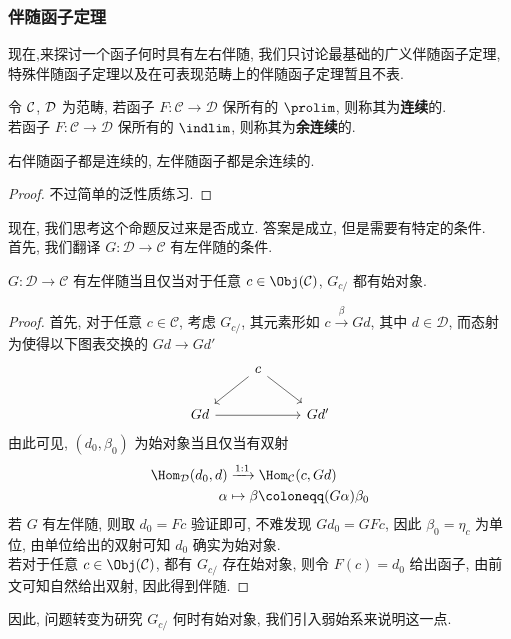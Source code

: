 \subsubsection{伴随函子定理}
现在,来探讨一个函子何时具有左右伴随, 我们只讨论最基础的广义伴随函子定理, 特殊伴随函子定理以及在可表现范畴上的伴随函子定理暂且不表.
\begin{definition}
    令 $\cal{C}$, $\cal{D}$ 为范畴, 若函子 $F \colon \mathcal{C}\to \mathcal{D}$ 保所有的 $\prolim$, 则称其为\textbf{连续}的.\\
    若函子 $F \colon \mathcal{C} \to \mathcal{D}$ 保所有的 $\indlim$, 则称其为\textbf{余连续}的.
\end{definition}
\begin{proposition}
    右伴随函子都是连续的, 左伴随函子都是余连续的.
\end{proposition}
\begin{proof}
    不过简单的泛性质练习.
\end{proof}
现在, 我们思考这个命题反过来是否成立. 答案是成立, 但是需要有特定的条件.\\
首先, 我们翻译 $G \colon \mathcal{D} \to \mathcal{C}$ 有左伴随的条件.
\begin{proposition}
    $G \colon \mathcal{D} \to \mathcal{C}$ 有左伴随当且仅当对于任意 $c \in \Obj(\cal{C})$, $G_{c/}$ 都有始对象.
\end{proposition}
\begin{proof}
    首先, 对于任意 $c \in \mathcal{C}$, 考虑 $G_{c/}$, 其元素形如 $c \xrightarrow{\beta} Gd$, 其中 $d \in \mathcal{D}$, 而态射为使得以下图表交换的 $Gd \to Gd'$
    \[\begin{tikzcd}
	& c \\
	Gd && {Gd'}
	\arrow[from=1-2, to=2-1]
	\arrow[from=1-2, to=2-3]
	\arrow[from=2-1, to=2-3]
    \end{tikzcd}\]
    由此可见, $(d_0,\beta_0)$ 为始对象当且仅当有双射
    \begin{align*}
        \Hom_{\cal{D}}(d_0,d) &\xrightarrow{1:1} \Hom_{\cal{C}}(c,Gd)\\
        \alpha &\mapsto \beta \coloneqq (G\alpha) \beta_0
    \end{align*}
    若 $G$ 有左伴随, 则取 $d_0 = Fc$ 验证即可, 不难发现 $Gd_0 = GFc$, 因此 $\beta_0 = \eta_c$ 为单位, 由单位给出的双射可知 $d_0$ 确实为始对象.\\
    若对于任意 $c\in \Obj(\mathcal{C})$, 都有 $G_{c/}$ 存在始对象, 则令 $F(c) = d_0$ 给出函子, 由前文可知自然给出双射, 因此得到伴随.
\end{proof}
因此, 问题转变为研究 $G_{c/}$ 何时有始对象, 我们引入弱始系来说明这一点.
